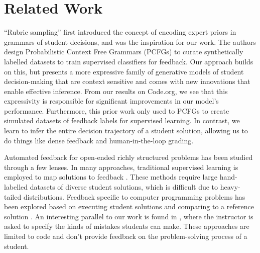 \section{Related Work}
\label{sec:related}
 ``Rubric sampling'' \cite{wu2018zero} first introduced the concept of encoding expert priors in grammars of student decisions, and was the inspiration for our work. The authors design Probabilistic Context Free Grammars (PCFGs) to curate synthetically labelled datasets to train supervised classifiers for feedback. Our approach builds on this, but presents a more expressive family of generative models of student decision-making that are context sensitive and comes with new innovations that enable effective inference. From our results on Code.org, we see that this expressivity is responsible for significant improvements in our model's performance. Furthermore, this prior work only used to PCFGs to create simulated datasets of feedback labels for supervised learning. In contrast, we learn to infer the entire decision trajectory of a student solution, allowing us to do things like dense feedback and human-in-the-loop grading.
 
  

Automated feedback for open-ended richly structured problems has been studied through a few lenses. In many approaches, traditional supervised learning is employed to map solutions to feedback \cite{feedbackEssayNilforoshan, feedbackEssayWoods, basu2013powergrading, yan_pyramid}. These methods require large hand-labelled datasets of diverse student solutions, which is difficult due to heavy-tailed distributions. Feedback specific to computer programming problems has been explored based on executing student solutions and comparing to a reference solution \cite{gulwani2013automated,feedbackFormalSemantics}. An interesting parallel to our work is found in \cite{gulwani2013automated}, where the instructor is asked to specify the kinds of mistakes students can make. These approaches are limited to code and don't provide feedback on the problem-solving process of a student. 


